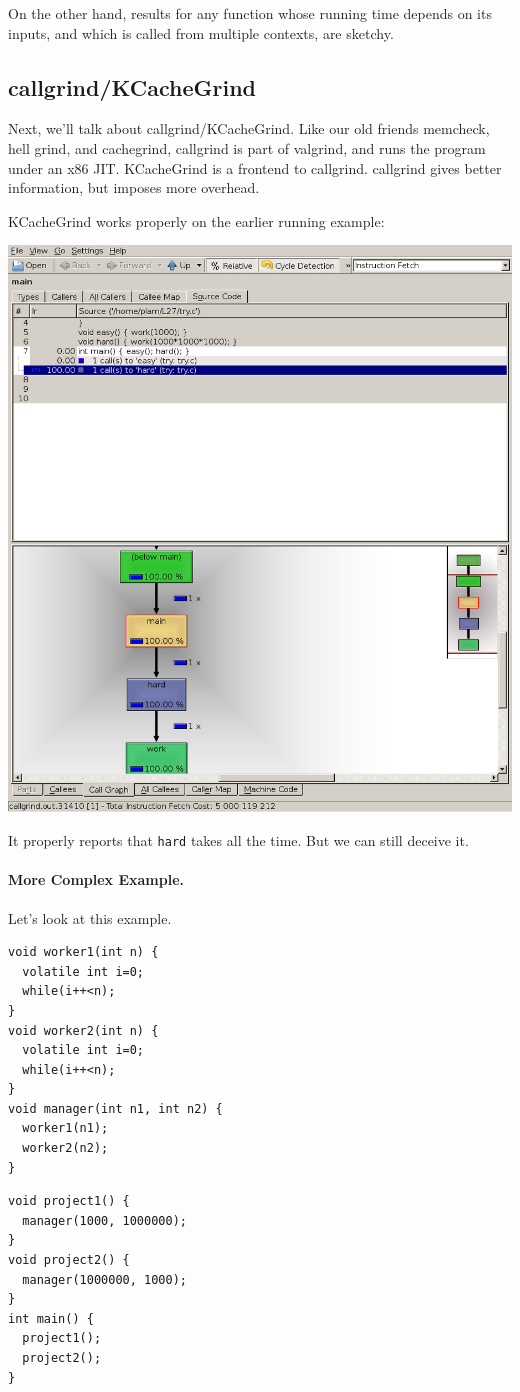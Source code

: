 \documentclass[a4paper]{report}
\begin{document}
On the other hand, results for any function whose running time depends on its inputs,
and which is called from multiple contexts, are sketchy.

\subsection*{callgrind/KCacheGrind}
Next, we'll talk about callgrind/KCacheGrind. Like our old friends memcheck, hell grind, and cachegrind, callgrind is part of valgrind, and runs the program under an x86 JIT.  KCacheGrind is a frontend to callgrind. callgrind gives better information, but imposes
more overhead.

\newpage
KCacheGrind works properly on the earlier running example:

\begin{center}
  \includegraphics[width=.4\textwidth]{images/kcachegrind}
\end{center}

It properly reports that {\tt hard} takes all the time.
But we can still deceive it.

\paragraph{More Complex Example.} Let's look at this example.

\begin{minipage}{.4\textwidth}
\begin{lstlisting}[basicstyle=\scriptsize]
void worker1(int n) {
  volatile int i=0;
  while(i++<n);
}
void worker2(int n) {
  volatile int i=0;
  while(i++<n);
}
void manager(int n1, int n2) {
  worker1(n1);
  worker2(n2);
}
\end{lstlisting}
\end{minipage}
\begin{minipage}{.4\textwidth}
\begin{lstlisting}[basicstyle=\scriptsize]
void project1() {
  manager(1000, 1000000);
}
void project2() {
  manager(1000000, 1000);
}
int main() {
  project1();
  project2();
}
\end{lstlisting}
\end{minipage}
\end{document}
